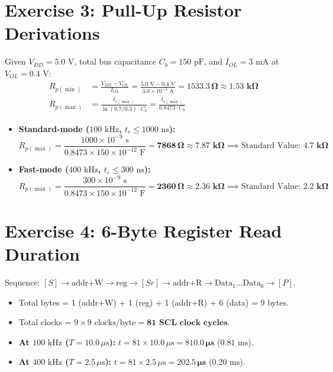 \documentclass[11pt,a4paper,oneside]{report}
\begin{document}
\section{Exercise 3: Pull-Up Resistor Derivations}
Given $V_{DD} = 5.0\text{ V}$, total bus capacitance $C_b = 150\text{ pF}$, and $I_{OL} = 3\text{ mA}$ at $V_{OL} = 0.4\text{ V}$:
\begin{align}
R_{p(\min)} &= \frac{V_{DD} - V_{OL}}{I_{OL}} = \frac{5.0\text{ V} - 0.4\text{ V}}{3.0\times 10^{-3}\text{ A}} = \mathbf{1533.3\,\Omega} \approx \mathbf{1.53\text{ k}\Omega} \\
R_{p(\max)} &= \frac{t_{r(\max)}}{\ln(0.7/0.3) \cdot C_b} = \frac{t_{r(\max)}}{0.8473 \cdot C_b}
\end{align}
\begin{itemize}
    \item \textbf{Standard-mode ($100\text{ kHz}$, $t_r \le 1000\text{ ns}$):}
    \begin{equation}
    R_{p(\max)} = \frac{1000\times 10^{-9}\text{ s}}{0.8473 \times 150\times 10^{-12}\text{ F}} = \mathbf{7868\,\Omega} \approx \mathbf{7.87\text{ k}\Omega} \implies \text{Standard Value: } \mathbf{4.7\text{ k}\Omega}
    \end{equation}
    \item \textbf{Fast-mode ($400\text{ kHz}$, $t_r \le 300\text{ ns}$):}
    \begin{equation}
    R_{p(\max)} = \frac{300\times 10^{-9}\text{ s}}{0.8473 \times 150\times 10^{-12}\text{ F}} = \mathbf{2360\,\Omega} \approx \mathbf{2.36\text{ k}\Omega} \implies \text{Standard Value: } \mathbf{2.2\text{ k}\Omega}
    \end{equation}
\end{itemize}

\section{Exercise 4: 6-Byte Register Read Duration}
Sequence: $[S] \to \text{addr+W} \to \text{reg} \to [Sr] \to \text{addr+R} \to \text{Data}_1 \dots \text{Data}_6 \to [P]$.
\begin{itemize}
    \item Total bytes = 1 (addr+W) + 1 (reg) + 1 (addr+R) + 6 (data) = 9 bytes.
    \item Total clocks = $9 \times 9\text{ clocks/byte} = \mathbf{81\text{ SCL clock cycles}}$.
    \item \textbf{At $100\text{ kHz}$ ($T = 10.0\,\mu\text{s}$):} $t = 81 \times 10.0\,\mu\text{s} = \mathbf{810.0\,\mu\text{s}}$ ($0.81\text{ ms}$).
    \item \textbf{At $400\text{ kHz}$ ($T = 2.5\,\mu\text{s}$):} $t = 81 \times 2.5\,\mu\text{s} = \mathbf{202.5\,\mu\text{s}}$ ($0.20\text{ ms}$).
\end{itemize}
\end{document}
